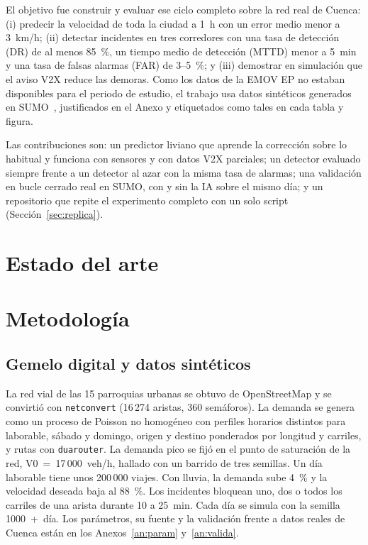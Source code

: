 \documentclass[conference,a4paper]{IEEEtran}
\begin{document}
El objetivo fue construir y evaluar ese ciclo completo sobre la red real de Cuenca: (i) predecir la velocidad de toda la ciudad a 1~h con un error medio menor a 3~km/h; (ii) detectar incidentes en tres corredores con una tasa de detección (DR) de al menos 85~\%, un tiempo medio de detección (MTTD) menor a 5~min y una tasa de falsas alarmas (FAR) de 3--5~\%; y (iii) demostrar en simulación que el aviso V2X reduce las demoras. Como los datos de la EMOV EP no estaban disponibles para el periodo de estudio, el trabajo usa datos sintéticos generados en SUMO~\cite{sumo}, justificados en el Anexo y etiquetados como tales en cada tabla y figura.

Las contribuciones son: un predictor liviano que aprende la corrección sobre lo habitual y funciona con sensores y con datos V2X parciales; un detector evaluado siempre frente a un detector al azar con la misma tasa de alarmas; una validación en bucle cerrado real en SUMO, con y sin la IA sobre el mismo día; y un repositorio que repite el experimento completo con un solo script (Sección~\ref{sec:replica}).

\section{Estado del arte}\label{sec:arte}


\section{Metodología}
\subsection{Gemelo digital y datos sintéticos}
La red vial de las 15 parroquias urbanas se obtuvo de OpenStreetMap y se convirtió con \texttt{netconvert} (16\,274 aristas, 360 semáforos). La demanda se genera como un proceso de Poisson no homogéneo con perfiles horarios distintos para laborable, sábado y domingo, origen y destino ponderados por longitud y carriles, y rutas con \texttt{duarouter}. La demanda pico se fijó en el punto de saturación de la red, V0~=~17\,000~veh/h, hallado con un barrido de tres semillas. Un día laborable tiene unos 200\,000 viajes. Con lluvia, la demanda sube 4~\% y la velocidad deseada baja al 88~\%. Los incidentes bloquean uno, dos o todos los carriles de una arista durante 10 a 25~min. Cada día se simula con la semilla 1000~+~día. Los parámetros, su fuente y la validación frente a datos reales de Cuenca están en los Anexos~\ref{an:param} y~\ref{an:valida}.
\end{document}
